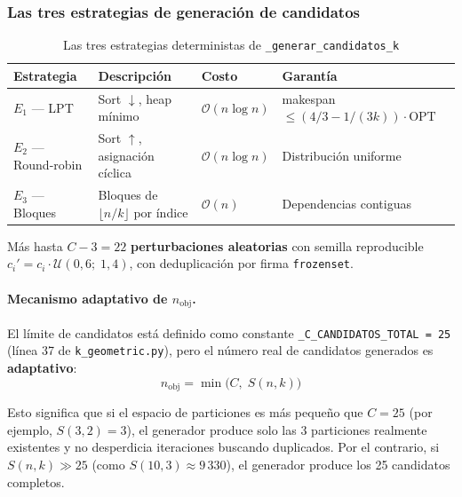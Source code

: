 \documentclass[12pt,letterpaper]{article}
\theoremstyle{definition}
\theoremstyle{remark}
\newcommand{\Stir}[2]{S(#1,#2)}
\newcommand{\BigO}[1]{\mathcal{O}(#1)}
\begin{document}
\subsubsection{Las tres estrategias de generación de candidatos}

\begin{table}[H]
\centering
\caption{Las tres estrategias deterministas de \texttt{\_generar\_candidatos\_k}}
\label{tab:estrategias}
\begin{tabular}{@{}l l l l@{}}
\toprule
\textbf{Estrategia} & \textbf{Descripción} & \textbf{Costo} & \textbf{Garantía} \\
\midrule
$E_1$ --- LPT & Sort $\downarrow$, heap mínimo & $\BigO{n \log n}$ &
  makespan $\leq (4/3 - 1/(3k))\cdot\mathrm{OPT}$ \\
$E_2$ --- Round-robin & Sort $\uparrow$, asignación cíclica & $\BigO{n \log n}$ &
  Distribución uniforme \\
$E_3$ --- Bloques & Bloques de $\lfloor n/k \rfloor$ por índice & $\BigO{n}$ &
  Dependencias contiguas \\
\bottomrule
\end{tabular}
\end{table}

Más hasta $C - 3 = 22$ \textbf{perturbaciones aleatorias} con semilla reproducible
$c_i' = c_i \cdot \mathcal{U}(0{,}6;\;1{,}4)$, con deduplicación por firma
\texttt{frozenset}.

\paragraph{Mecanismo adaptativo de $n_{\mathrm{obj}}$.}

El límite de candidatos está definido como constante
\texttt{\_C\_CANDIDATOS\_TOTAL = 25} (línea 37 de \texttt{k\_geometric.py}),
pero el número real de candidatos generados es \textbf{adaptativo}:
\begin{equation}
  n_{\mathrm{obj}} = \min\!\bigl(C,\; \Stir{n}{k}\bigr)
  \label{eq:n_obj}
\end{equation}

Esto significa que si el espacio de particiones es más pequeño que $C = 25$
(por ejemplo, $\Stir{3}{2} = 3$), el generador produce solo las 3 particiones
realmente existentes y no desperdicia iteraciones buscando duplicados.
Por el contrario, si $\Stir{n}{k} \gg 25$ (como $\Stir{10}{3} \approx 9\,330$),
el generador produce los 25 candidatos completos.
\end{document}
